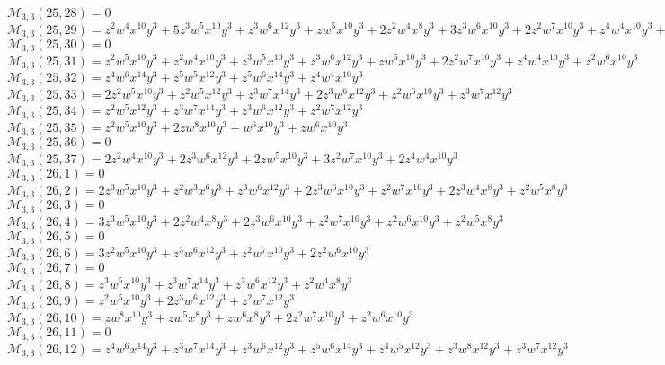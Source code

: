 $\mathcal{M}_{3,3}(25,28)=0$\\
$\mathcal{M}_{3,3}(25,29)=z^2w^4x^{10}y^3+5z^3w^5x^{10}y^3+z^3w^6x^{12}y^3+zw^5x^{10}y^3+2z^2w^4x^8y^3+3z^3w^6x^{10}y^3+2z^2w^7x^{10}y^3+z^4w^4x^{10}y^3+z^2w^5x^8y^3$\\
$\mathcal{M}_{3,3}(25,30)=0$\\
$\mathcal{M}_{3,3}(25,31)=z^2w^5x^{10}y^3+z^2w^4x^{10}y^3+z^3w^5x^{10}y^3+z^3w^6x^{12}y^3+zw^5x^{10}y^3+2z^2w^7x^{10}y^3+z^4w^4x^{10}y^3+z^2w^6x^{10}y^3$\\
$\mathcal{M}_{3,3}(25,32)=z^4w^6x^{14}y^3+z^5w^5x^{12}y^3+z^5w^6x^{14}y^3+z^4w^4x^{10}y^3$\\
$\mathcal{M}_{3,3}(25,33)=2z^2w^5x^{10}y^3+z^2w^5x^{12}y^3+z^3w^7x^{14}y^3+2z^3w^6x^{12}y^3+z^2w^6x^{10}y^3+z^3w^7x^{12}y^3$\\
$\mathcal{M}_{3,3}(25,34)=z^2w^5x^{12}y^3+z^3w^7x^{14}y^3+z^3w^6x^{12}y^3+z^2w^7x^{12}y^3$\\
$\mathcal{M}_{3,3}(25,35)=z^2w^5x^{10}y^3+2zw^8x^{10}y^3+w^6x^{10}y^3+zw^6x^{10}y^3$\\
$\mathcal{M}_{3,3}(25,36)=0$\\
$\mathcal{M}_{3,3}(25,37)=2z^2w^4x^{10}y^3+2z^3w^6x^{12}y^3+2zw^5x^{10}y^3+3z^2w^7x^{10}y^3+2z^4w^4x^{10}y^3$\\
$\mathcal{M}_{3,3}(26,1)=0$\\
$\mathcal{M}_{3,3}(26,2)=2z^3w^5x^{10}y^3+z^2w^3x^6y^3+z^3w^6x^{12}y^3+2z^3w^6x^{10}y^3+z^2w^7x^{10}y^3+2z^3w^4x^8y^3+z^2w^5x^8y^3$\\
$\mathcal{M}_{3,3}(26,3)=0$\\
$\mathcal{M}_{3,3}(26,4)=3z^3w^5x^{10}y^3+2z^2w^4x^8y^3+2z^3w^6x^{10}y^3+z^2w^7x^{10}y^3+z^2w^6x^{10}y^3+z^2w^5x^8y^3$\\
$\mathcal{M}_{3,3}(26,5)=0$\\
$\mathcal{M}_{3,3}(26,6)=3z^2w^5x^{10}y^3+z^3w^6x^{12}y^3+z^2w^7x^{10}y^3+2z^2w^6x^{10}y^3$\\
$\mathcal{M}_{3,3}(26,7)=0$\\
$\mathcal{M}_{3,3}(26,8)=z^3w^5x^{10}y^3+z^3w^7x^{14}y^3+z^3w^6x^{12}y^3+z^2w^4x^8y^3$\\
$\mathcal{M}_{3,3}(26,9)=z^2w^5x^{10}y^3+2z^3w^6x^{12}y^3+z^2w^7x^{12}y^3$\\
$\mathcal{M}_{3,3}(26,10)=zw^8x^{10}y^3+zw^5x^8y^3+zw^6x^8y^3+2z^2w^7x^{10}y^3+z^2w^6x^{10}y^3$\\
$\mathcal{M}_{3,3}(26,11)=0$\\
$\mathcal{M}_{3,3}(26,12)=z^4w^6x^{14}y^3+z^3w^7x^{14}y^3+z^3w^6x^{12}y^3+z^5w^6x^{14}y^3+z^4w^5x^{12}y^3+z^3w^8x^{12}y^3+z^3w^7x^{12}y^3$\\

